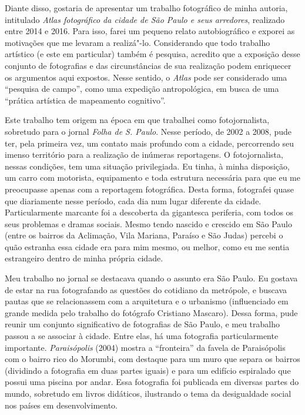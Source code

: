 Diante disso, gostaria de apresentar um trabalho fotográfico de minha
autoria, intitulado \emph{Atlas fotográfico da cidade de São Paulo e
seus arredores}, realizado entre 2014 e 2016. Para isso, farei um
pequeno relato autobiográfico e exporei as motivações que me levaram a
realizá"-lo. Considerando que todo trabalho artístico (e este em
particular) também é pesquisa, acredito que a exposição desse conjunto
de fotografias e das circunstâncias de sua realização podem enriquecer
os argumentos aqui expostos. Nesse sentido, o \emph{Atlas} pode ser
considerado uma ``pesquisa de campo'', como uma expedição antropológica,
em busca de uma ``prática artística de mapeamento cognitivo''.

Este trabalho tem origem na época em que trabalhei como fotojornalista,
sobretudo para o jornal \emph{Folha de S. Paulo}. Nesse período, de 2002
a 2008, pude ter, pela primeira vez, um contato mais profundo com a
cidade, percorrendo seu imenso território para a realização de inúmeras
reportagens. O fotojornalista, nessas condições, tem uma situação
privilegiada. Eu tinha, à minha disposição, um carro com motorista,
equipamento e toda estrutura necessária para que eu me preocupasse
apenas com a reportagem fotográfica. Desta forma, fotografei quase que
diariamente nesse período, cada dia num lugar diferente da cidade.
Particularmente marcante foi a descoberta da gigantesca periferia, com todos os seus problemas e dramas sociais. Mesmo tendo
nascido e crescido em São Paulo (entre os bairros da Aclimação, Vila
Mariana, Paraíso e São Judas) percebi o quão estranha essa cidade era
para mim mesmo, ou melhor, como eu me sentia estrangeiro dentro de minha
própria cidade.

Meu trabalho no jornal se destacava quando o assunto era São Paulo. Eu
gostava de estar na rua fotografando as questões do cotidiano da
metrópole, e buscava pautas que se relacionassem com a arquitetura e o
urbanismo (influenciado em grande medida pelo trabalho do fotógrafo
Cristiano Mascaro). Dessa forma, pude reunir um conjunto significativo
de fotografias de São Paulo, e meu trabalho passou a se associar à
cidade. Entre elas, há uma fotografia particularmente importante.
\emph{Paraisópolis} (2004) mostra a ``fronteira'' da favela de
Paraisópolis com o bairro rico do Morumbi, com destaque para um muro que
separa os bairros (dividindo a fotografia em duas partes iguais) e para
um edifício espiralado que possui uma piscina por andar. Essa fotografia
foi publicada em diversas partes do mundo, sobretudo em livros
didáticos, ilustrando o tema da desigualdade social nos países em
desenvolvimento.

